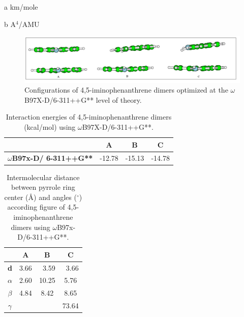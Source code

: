 \begin{table}[H]
\begin{center}
\begin{threeparttable}
				\begin{tablenotes}
					\item[a] km/mole
					\item[b] A$^{4}$/AMU
				\end{tablenotes}
			\end{threeparttable}
		\end{center}
		\label{freqCarbazoleDi}
	\end{table}
	
	
	\begin{figure}[H]
		\centering
		\includegraphics[scale=0.5]{image/45-iminopphenanthrene}
		\caption{Configurations of 4,5-iminophenanthrene dimers optimized at the $\omega$B97X-D/6-311++G** level of theory.}  \label{fig-45-iminoDi}
	\end{figure}
	
	
	\begin{table}[H]
		\caption{Interaction energies of 4,5-iminophenanthrene dimers (kcal/mol) using $\omega$B97X-D/6-311++G**.}
		\begin{center}
			\begin{tabular}{c c c c}
				\hline
				& \textbf{A} & \textbf{B} & \textbf{C} \\ \hline
				\textbf{$\omega$B97x-D/
					6-311++G**} & -12.78 & -15.13 & -14.78 \\ \hline
			\end{tabular}
		\end{center}
		\label{}
	\end{table}
	
	\begin{table}[H]
		\caption{Intermolecular distance between pyrrole ring center (Å) and angles ($^{\circ}$) according figure  of  4,5-iminophenanthrene dimers using $\omega$B97x-D/6-311++G**.}
		\begin{center}
			\begin{tabular}{c c c c}
				\hline
				& \multicolumn{1}{c}{\textbf{A}} & \multicolumn{1}{c}{\textbf{B}} & \multicolumn{1}{c}{\textbf{C}} \\ \hline
				\textbf{d} & \multicolumn{1}{r}{3.66} & \multicolumn{1}{r}{3.59} & \multicolumn{1}{r}{3.66} \\ 
				\textbf{$\alpha$}& 2.60 &10.25 & 5.76 \\ 
				\textbf{$\beta$} & 4.84 & 8.42 & 8.65\\ 
				\textbf{$\gamma$} & &  &73.64 \\ \hline
			\end{tabular}
		\end{center}
		\label{}
	\end{table}
	

